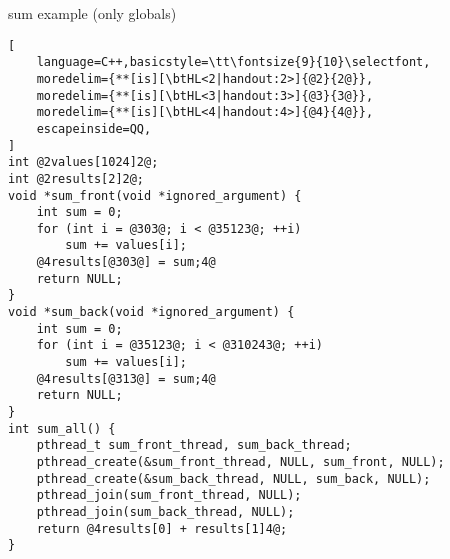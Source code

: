 \begin{frame}[fragile,label=sumToGlobal]{sum example (only globals)}
\begin{lstlisting}[
    language=C++,basicstyle=\tt\fontsize{9}{10}\selectfont,
    moredelim={**[is][\btHL<2|handout:2>]{@2}{2@}},
    moredelim={**[is][\btHL<3|handout:3>]{@3}{3@}},
    moredelim={**[is][\btHL<4|handout:4>]{@4}{4@}},
    escapeinside=QQ,
]
int @2values[1024]2@;
int @2results[2]2@;
void *sum_front(void *ignored_argument) {
    int sum = 0;
    for (int i = @303@; i < @35123@; ++i)
        sum += values[i];
    @4results[@303@] = sum;4@
    return NULL;
}
void *sum_back(void *ignored_argument) {
    int sum = 0;
    for (int i = @35123@; i < @310243@; ++i)
        sum += values[i];
    @4results[@313@] = sum;4@
    return NULL;
}
int sum_all() {
    pthread_t sum_front_thread, sum_back_thread;
    pthread_create(&sum_front_thread, NULL, sum_front, NULL);
    pthread_create(&sum_back_thread, NULL, sum_back, NULL);
    pthread_join(sum_front_thread, NULL);
    pthread_join(sum_back_thread, NULL);
    return @4results[0] + results[1]4@;
}
\end{lstlisting}
\end{frame}


